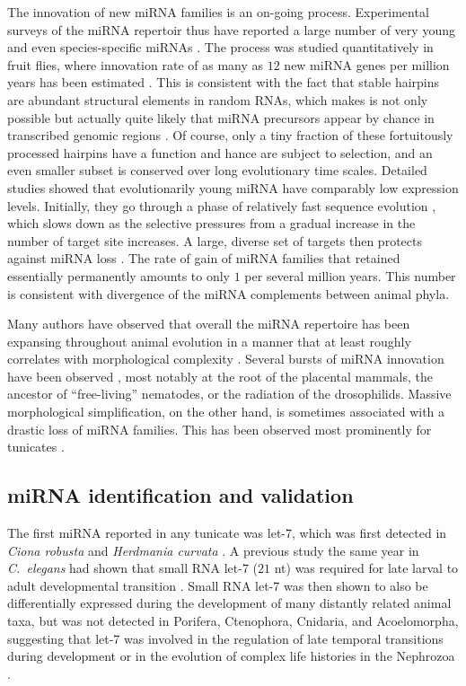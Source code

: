 \documentclass[graybox]{svmult}
\begin{document}
The innovation of new miRNA families is an on-going process. Experimental
surveys of the miRNA repertoir thus have reported a large number of very
young and even species-specific miRNAs \cite{Bentwich:05, Berezikov:06}. The
process was studied quantitatively in fruit flies, where innovation rate of
as many as $12$ new miRNA genes per million years has been estimated
\cite{Lu:08}. This is consistent with the fact that stable hairpins are
abundant structural elements in random RNAs, which makes is not only
possible but actually quite likely that miRNA precursors appear by chance
in transcribed genomic regions \cite{Tanzer:04a, CampoPaysaa:11, Marco:13}.
Of course, only a tiny fraction of these fortuitously processed hairpins
have a function and hance are subject to selection, and an even smaller
subset is conserved over long evolutionary time scales. Detailed studies
showed that evolutionarily young miRNA have comparably low expression
levels. Initially, they go through a phase of relatively fast sequence
evolution \cite{Liang:09, Meunier:12}, which slows down as the selective
pressures from a gradual increase in the number of target site increases. A
large, diverse set of targets then protects against miRNA loss
\cite{Lee:07a}. The rate of gain of miRNA families that retained
essentially permanently amounts to only $1$ per several million years. This
number is consistent with divergence of the miRNA complements between
animal phyla.

Many authors have observed that overall the miRNA repertoire has been
expansing throughout animal evolution in a manner that at least roughly
correlates with morphological complexity \cite{Hertel:06a, Sempere:06,
  Niwa:07, Prochnik:07, Lee:07a, Heimberg:08, Peterson:09,
  Berezikov:11}. Several bursts of miRNA innovation have been observed
\cite{Hertel:06a, Heimberg:08, Tanzer:10a, Hertel:15a}, most notably at the
root of the placental mammals, the ancestor of ``free-living'' nematodes,
or the radiation of the drosophilids.  Massive morphological
simplification, on the other hand, is sometimes associated with a drastic
loss of miRNA families. This has been observed most prominently for
tunicates \cite{Fu:08, Dai:09}.

\subsection{miRNA identification and validation}

The first miRNA reported in any tunicate was let-7, which was 
first detected in \textit{Ciona robusta} and \textit{Herdmania curvata} 
\cite{Pasquinelli2000}. A previous study the same year in \textit{C.\ elegans} 
had shown that small RNA let-7 ($21$ nt) was required for late larval to adult 
developmental transition \cite{Reinhart:2000mz}. Small RNA let-7 was then shown 
to also be differentially expressed during the development of many distantly 
related animal taxa, but was not detected in Porifera, Ctenophora, Cnidaria, 
and Acoelomorpha, suggesting that let-7 was involved in the regulation of late 
temporal transitions during development or in the evolution of complex life 
histories in the Nephrozoa \cite{Pasquinelli2000,Pasquinelli2003}.
\end{document}
